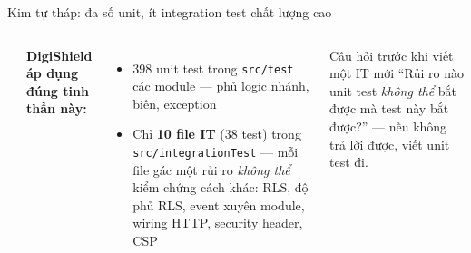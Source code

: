 \documentclass[aspectratio=169,12pt]{beamer}
\begin{document}
\begin{frame}{Kim tự tháp: đa số unit, ít integration test chất lượng cao}
  \begin{columns}
    \begin{center}
    \end{center}
    \textbf{DigiShield áp dụng đúng tinh thần này:}
    \begin{itemize}\small
      \item 398 unit test trong \texttt{src/test} các module --- phủ
        logic nhánh, biên, exception
      \item Chỉ \textbf{10 file IT} (38 test) trong \texttt{src/integrationTest}
        --- mỗi file gác một rủi ro \emph{không thể} kiểm chứng cách khác:
        RLS, độ phủ RLS, event xuyên module, wiring HTTP, security header, CSP
    \end{itemize}
    \begin{exampleblock}{Câu hỏi trước khi viết một IT mới}
      ``Rủi ro nào unit test \emph{không thể} bắt được mà test này bắt
      được?'' --- nếu không trả lời được, viết unit test đi.
    \end{exampleblock}
  \end{columns}
\end{frame}
\end{document}
